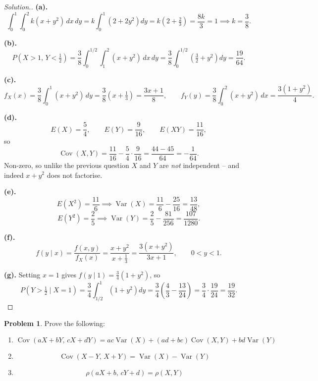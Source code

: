 \documentclass[12pt,a4paper]{report}
\theoremstyle{definition}
\theoremstyle{plain}
\theoremstyle{definition}
\newtheorem{problemx}{Problem}[section]
\newenvironment{problem}{\begin{problemx}}{\end{problemx}}
\newenvironment{solution}
  {\renewcommand{\qedsymbol}{}\begin{proof}[\textit{Solution}.]}
  {\end{proof}}
\begin{document}
\begin{solution}
\textbf{(a).} \[\int_0^1\!\!\int_0^2 k(x+y^{2})\,dx\,dy
 = k\int_0^1\left(2+2y^{2}\right)dy = k\left(2+\tfrac23\right) = \frac{8k}{3} = 1
 \implies k = \frac{3}{8}.\]

\textbf{(b).} \[P\left(X>1,\,Y<\tfrac12\right)
 = \frac{3}{8}\int_0^{1/2}\!\!\int_1^2 (x+y^{2})\,dx\,dy
 = \frac{3}{8}\int_0^{1/2}\left(\tfrac32+y^{2}\right)dy = \frac{19}{64}.\]

\textbf{(c).} \[f_X(x) = \frac{3}{8}\int_0^1 (x+y^{2})\,dy = \frac{3}{8}\left(x+\tfrac13\right)
 = \frac{3x+1}{8},\qquad
f_Y(y) = \frac{3}{8}\int_0^2 (x+y^{2})\,dx = \frac{3\left(1+y^{2}\right)}{4}.\]

\textbf{(d).} \[E(X) = \frac{5}{4},\qquad E(Y) = \frac{9}{16},\qquad E(XY) = \frac{11}{16},\]
so
\[\operatorname{Cov}(X,Y) = \frac{11}{16}-\frac{5}{4}\cdot\frac{9}{16}
 = \frac{44-45}{64} = -\frac{1}{64}.\]
Non-zero, so unlike the previous question $X$ and $Y$ are \emph{not} independent -- and
indeed $x+y^{2}$ does not factorise.

\textbf{(e).} \[E(X^{2}) = \frac{11}{6} \implies \operatorname{Var}(X) = \frac{11}{6}-\frac{25}{16}
 = \frac{13}{48},\]
\[E(Y^{2}) = \frac{2}{5} \implies \operatorname{Var}(Y) = \frac{2}{5}-\frac{81}{256}
 = \frac{107}{1280}.\]

\textbf{(f).} \[f(y\mid x) = \frac{f(x,y)}{f_X(x)} = \frac{x+y^{2}}{x+\tfrac13}
 = \frac{3\left(x+y^{2}\right)}{3x+1},\qquad 0<y<1.\]

\textbf{(g).} Setting $x=1$ gives $f(y\mid 1) = \tfrac34\left(1+y^{2}\right)$, so
\[P\left(Y>\tfrac12\mid X=1\right) = \frac{3}{4}\int_{1/2}^{1}\left(1+y^{2}\right)dy
 = \frac{3}{4}\left(\frac{4}{3}-\frac{13}{24}\right) = \frac{3}{4}\cdot\frac{19}{24}
 = \frac{19}{32}.\]
\end{solution}

\begin{problem}
Prove the following:
\begin{enumerate}
\item[(a).] \[\operatorname{Cov}(aX+bY,\,cX+dY) = ac\operatorname{Var}(X)
 +(ad+bc)\operatorname{Cov}(X,Y)+bd\operatorname{Var}(Y)\]
\item[(b).] \[\operatorname{Cov}(X-Y,\,X+Y) = \operatorname{Var}(X)-\operatorname{Var}(Y)\]
\item[(c).] \[\rho(aX+b,\,cY+d) = \rho(X,Y)\]
\end{enumerate}
\end{problem}
\end{document}
